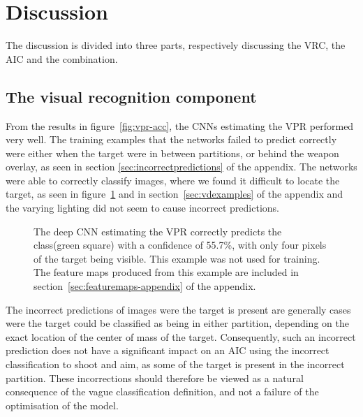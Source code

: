 
\section{Discussion}
\label{sec:discussion}
The discussion is divided into three parts, respectively discussing the VRC, the AIC and the combination.

\subsection{The visual recognition component}
From the results in figure~\ref{fig:vpr-acc}, the CNNs estimating the VPR performed very well. The training examples that the networks failed to predict correctly were either when the target were in between partitions, or behind the weapon overlay, as seen in section \ref{sec:incorrectpredictions} of the appendix. The networks were able to correctly classify images, where we found it difficult to locate the target, as seen in figure~\ref{fig:hardprediction} and in section~\ref{sec:vdexamples} of the appendix and the varying lighting did not seem to cause incorrect predictions.

\begin{figure}[h]
	\begin{scriptsize}
		\sffamily
		\def\svgwidth{\textwidth}
		
	\end{scriptsize}
	\caption[Difficult VPR classification example]{The deep CNN estimating the VPR correctly predicts the class(green square) with a confidence of 55.7\%, with only four pixels of the target being visible. This example was not used for training. The feature maps produced from this example are included in section~\ref{sec:featuremaps-appendix} of the appendix.}
	\label{fig:hardprediction}
\end{figure}

The incorrect predictions of images were the target is present are generally cases were the target could be classified as being in either partition, depending on the exact location of the center of mass of the target. Consequently, such an incorrect prediction does not have a significant impact on an AIC using the incorrect classification to shoot and aim, as some of the target is present in the incorrect partition. These incorrections should therefore be viewed as a natural consequence of the vague classification definition, and not a failure of the optimisation of the model.

